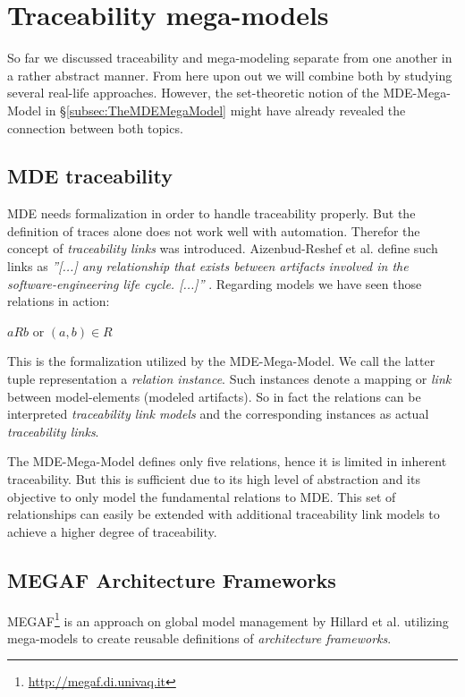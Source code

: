 \section{Traceability mega-models}\label{sec:TraceabilityMegamodels}
So far we discussed traceability and mega-modeling separate from one another in a rather abstract manner. From here upon out we will combine both by studying several real-life approaches. However, the set-theoretic notion of the MDE-Mega-Model in §\ref{subsec:TheMDEMegaModel} might have already revealed the connection between both topics. 

\subsection{MDE traceability}
MDE needs formalization in order to handle traceability properly. But the definition of traces alone does not work well with automation. Therefor the concept of \textit{traceability links} was introduced. Aizenbud-Reshef et al. define such links as \textit{''[...] any relationship that exists between artifacts involved in the software-engineering life cycle. [...]''} \cite{ModelTraceability}. Regarding models we have seen those relations in action:
\begin{center}
$a R b$
or
$(a,b) \in R$
\end{center}
This is the formalization utilized by the MDE-Mega-Model. We call the latter tuple representation a \textit{relation instance}. Such instances denote a mapping or \textit{link} between model-elements (modeled artifacts). So in fact the relations can be interpreted \textit{traceability link models} and the corresponding instances as actual \textit{traceability links}.

The MDE-Mega-Model defines only five relations, hence it is limited in inherent traceability. But this is sufficient due to its high level of abstraction and its objective to only model the fundamental relations to MDE. This set of relationships can easily be extended with additional traceability link models to achieve a higher degree of traceability. 

\subsection{MEGAF Architecture Frameworks}\label{subsec:ArchitectureFrameworkMegaModels}
MEGAF\footnote{\url{http://megaf.di.univaq.it}} is an approach on global model management by Hillard et al. \cite{MEGAF} utilizing mega-models to create reusable definitions of \textit{architecture frameworks}.

